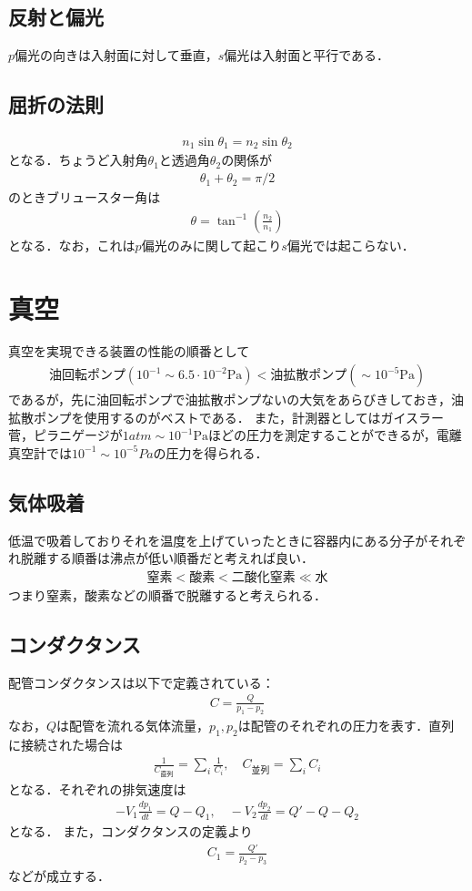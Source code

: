 \documentclass[12pt,dvipdfmx]{jsarticle}
\begin{document}
\subsection*{反射と偏光}
$p$偏光の向きは入射面に対して垂直，$s$偏光は入射面と平行である．
\subsection*{屈折の法則}
\begin{eqnarray}
  n_1 \sin\theta_1 = n_2\sin\theta_2
\end{eqnarray}
となる．ちょうど入射角$\theta_1$と透過角$\theta_2$の関係が
\begin{eqnarray}
  \theta_1 + \theta_2 =\pi/2
\end{eqnarray}
のときブリュースター角は
\begin{eqnarray}
  \theta = \tan^{-1}\left(\frac{n_2}{n_1}\right)
\end{eqnarray}
となる．なお，これは$p$偏光のみに関して起こり$s$偏光では起こらない．
\section*{\Large{真空}}
真空を実現できる装置の性能の順番として
\begin{eqnarray}
  油回転ポンプ(10^{-1}\sim 6.5\cdot 10^{-2}\text{Pa}) < 油拡散ポンプ(\sim 10^{-5}\text{Pa})
\end{eqnarray}
であるが，先に油回転ポンプで油拡散ポンプないの大気をあらびきしておき，油拡散ポンプを使用するのがベストである．
また，計測器としてはガイスラー菅，ピラニゲージが$1atm\sim 10^{-1}\text{Pa}$ほどの圧力を測定することができるが，電離真空計では$10^{-1}\sim 10^{-5}Pa$の圧力を得られる．
\subsection*{気体吸着}
低温で吸着しておりそれを温度を上げていったときに容器内にある分子がそれぞれ脱離する順番は沸点が低い順番だと考えれば良い．
\begin{eqnarray}
  窒素 < 酸素 < 二酸化窒素 \ll 水
\end{eqnarray}
つまり窒素，酸素などの順番で脱離すると考えられる．
\subsection*{コンダクタンス}

配管コンダクタンスは以下で定義されている：
\begin{eqnarray}
  C = \frac{Q}{p_1-p_2}
\end{eqnarray}
なお，$Q$は配管を流れる気体流量，$p_1,p_2$は配管のそれぞれの圧力を表す．直列に接続された場合は
\begin{eqnarray}
  \frac{1}{C_{直列}}= \sum_i \frac{1}{C_i}, \quad C_{並列} = \sum_i C_i
\end{eqnarray}
となる．それぞれの排気速度は
\begin{eqnarray}
  -V_1 \frac{d p_1}{dt} = Q-Q_1,\quad -V_2 \frac{d p_2}{dt}= Q'-Q-Q_2
\end{eqnarray}
となる．
また，コンダクタンスの定義より
\begin{eqnarray}
  C_1 = \frac{Q'}{p_2-p_3}
\end{eqnarray}
などが成立する．
\end{document}
